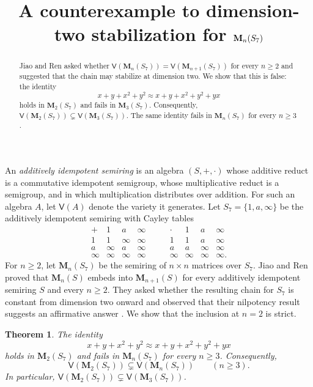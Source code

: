 \documentclass[11pt]{amsart}
\title[Dimension-two stabilization for $\M_n(S_7)$]
{A counterexample to dimension-two stabilization for $\M_n(S_7)$}
\date{}
\newcommand{\M}{\mathbf{M}}
\newcommand{\V}{\mathsf{V}}
\newtheorem{theorem}{Theorem}
\begin{document}
\begin{abstract}
Jiao and Ren asked whether
$\V(\M_n(S_7))=\V(\M_{n+1}(S_7))$ for every $n\geq 2$ and suggested
that the chain may stabilize at dimension two. We show that this is false:
the identity
\[
 x+y+x^2+y^2 \approx x+y+x^2+y^2+yx
\]
holds in $\M_2(S_7)$ and fails in $\M_3(S_7)$. Consequently,
$\V(\M_2(S_7))\subsetneq\V(\M_3(S_7))$. The same identity fails in
$\M_n(S_7)$ for every $n\geq 3$.
\end{abstract}

\maketitle

An \emph{additively idempotent semiring} is an algebra $(S,+,\cdot)$
whose additive reduct is a commutative idempotent semigroup, whose
multiplicative reduct is a semigroup, and in which multiplication distributes
over addition. For such an algebra $A$, let $\V(A)$ denote the variety it
generates. Let $S_7=\{1,a,\infty\}$ be the additively idempotent semiring
with Cayley tables
\[
\begin{array}{c|ccc}
 + & 1 & a & \infty \\ \hline
 1 & 1 & \infty & \infty \\
 a & \infty & a & \infty \\
 \infty & \infty & \infty & \infty
\end{array}
\qquad
\begin{array}{c|ccc}
 \cdot & 1 & a & \infty \\ \hline
 1 & 1 & a & \infty \\
 a & a & \infty & \infty \\
 \infty & \infty & \infty & \infty .
\end{array}
\]
For $n\geq 2$, let $\M_n(S_7)$ be the semiring of $n\times n$ matrices
over $S_7$. Jiao and Ren proved that $\M_n(S)$ embeds into
$\M_{n+1}(S)$ for every additively idempotent semiring $S$ and every
$n\geq 2$. They asked whether the resulting chain for $S_7$ is constant
from dimension two onward and observed that their nilpotency result suggests
an affirmative answer \cite[Theorem~2.1 and Section~5]{JiaoRen}. We show
that the inclusion at $n=2$ is strict.

\begin{theorem}\label{thm:main}
The identity
\begin{equation}\label{eq:identity}
 x+y+x^2+y^2 \approx x+y+x^2+y^2+yx
\end{equation}
holds in $\M_2(S_7)$ and fails in $\M_n(S_7)$ for every $n\geq 3$.
Consequently,
\[
 \V(\M_2(S_7))\subsetneq\V(\M_n(S_7))
 \qquad(n\geq 3).
\]
In particular,
$\V(\M_2(S_7))\subsetneq\V(\M_3(S_7))$.
\end{theorem}
\end{document}
